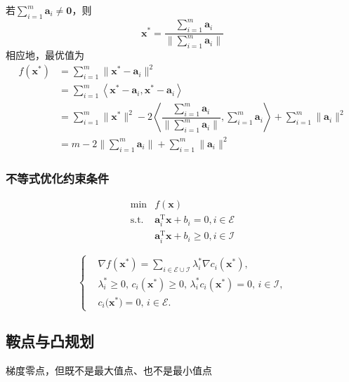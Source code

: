 \begin{example}
\begin{solution}
        若$\sum\limits_{i = 1}^{m}\boldsymbol{a}_i \neq \boldsymbol{0}$，则
        \[
            \boldsymbol{x}^*=\dfrac{\sum_{i=1}^m\boldsymbol{a}_i}{\|\sum_{i=1}^m\boldsymbol{a}_i\|}
        \]
        相应地，最优值为
        \[
            \begin{aligned}
                f(\boldsymbol{x}^*) &= \sum_{i=1}^{m}\|\boldsymbol{x}^*-\boldsymbol{a}_{i}\|^{2} \\
                & = \sum_{i=1}^{m}\left< \boldsymbol{x}^*-\boldsymbol{a}_{i},\boldsymbol{x}^*-\boldsymbol{a}_{i} \right>\\
                & =\sum_{i=1}^{m}\|\boldsymbol{x}^*\|^2-2\left<\dfrac{\sum_{i=1}^m\boldsymbol{a}_i}{{\|\sum_{i=1}^m\boldsymbol{a}_i\|}},\sum_{i=1}^m\boldsymbol{a}_i\right>+\sum_{i=1}^m\|\boldsymbol{a}_i\|^2\\
                &=m-2\|\sum_{i=1}^m\boldsymbol{a}_i\|+\sum_{i=1}^m\|\boldsymbol{a}_i\|^2
            \end{aligned}
        \]
    \end{solution}
\end{example}
\subsubsection{不等式优化约束条件}
\[
    \begin{array}{ll}
        \min&f(\boldsymbol{x})\\
        \mathrm{s.t.}&\boldsymbol{a}_{i}^{\mathrm{T}}\boldsymbol{x}+b_{i}=0,i\in\mathcal{E}\\
        &\boldsymbol{a}_{i}^{\mathrm{T}}\boldsymbol{x}+b_{i}\geqslant0,i\in\mathcal{I}
    \end{array}
\]
\begin{theorem}[完整KKT条件]
    \[
        \left\{
            \begin{aligned}
                &\nabla f(\boldsymbol{x}^{*})=\sum_{i\in\mathcal{E}\cup\mathcal{I}}\lambda_{i}^{*}\nabla c_{i}(\boldsymbol{x}^{*}),\\
                &\lambda_{i}^{*}\geqslant 0,\,c_{i}(\boldsymbol{x}^{*})\geqslant 0,\,\lambda_{i}^{*}c_{i}(\boldsymbol{x}^{*})=0,\,i\in\mathcal{I},\\
                &c_{i}\big(\boldsymbol{x}^{*}\big)=0,\,i\in\mathcal{E}.
            \end{aligned}
        \right.
    \]
\end{theorem}
\subsection{鞍点与凸规划}
\begin{definition}[函数的鞍点]
    梯度零点，但既不是最大值点、也不是最小值点
\end{definition}
